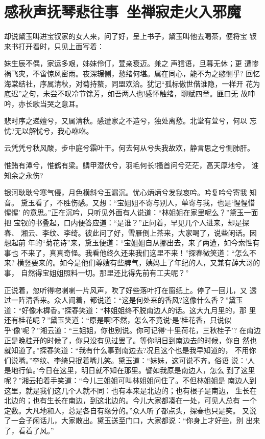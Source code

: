 \chapter{感秋声抚琴悲往事~坐禅寂走火入邪魔}

却说黛玉叫进宝钗家的女人来，问了好，呈上书子，黛玉叫他去喝茶，便将宝
钗来书打开看时，只见上面写着：

妹生辰不偶，家运多艰，姊妹伶仃，萱亲衰迈。兼之声狺语，旦暮无休；更
遭惨祸飞灾，不啻惊风密雨。夜深辗侧，愁绪何堪。属在同心，能不为之愍恻乎?
回忆海棠结社，序属清秋，对菊持螯，同盟欢洽。犹记“孤标傲世偕谁隐，一样开
花为底迟”之句，未尝不叹冷节馀芳，如吾两人也!感怀触绪，聊赋四章。匪曰无
故呻吟，亦长歌当哭之意耳。

悲时序之递嬗兮，又属清秋。感遭家之不造兮，独处离愁。北堂有萱兮，何以
忘忧?无以解忧兮，我心咻咻。

云凭凭兮秋风酸，步中庭兮霜叶干。何去何从兮失我故欢，静言思之兮恻肺肝。

惟鲔有潭兮，惟鹤有梁。鳞甲潜伏兮，羽毛何长!搔首问兮茫茫，高天厚地兮，
谁知余之永伤?

银河耿耿兮寒气侵，月色横斜兮玉漏沉。忧心炳炳兮发我哀吟。吟复吟兮寄我
知音。
黛玉看了，不胜伤感。又想：“宝姐姐不寄与别人，单寄与我，也是‘惺惺惜惺惺’
的意思。”正在沉吟，只听见外面有人说道：“林姐姐在家里呢么？”黛玉一面把
宝钗的书叠起，口内便答应道：“是谁？”正问着，早见几个人进来，却是探春、
湘云、李纹、李绮。彼此问了好，雪雁倒上茶来，大家喝了，说些闲话。因想起前
年的“菊花诗”来，黛玉便道：“宝姐姐自从挪出去，来了两遭，如今索性有事也
不来了，真真奇怪。我看他终久还来我们这里不来！”探春微笑道：“怎么不来?
横竖要来的。如今是他们尊嫂有些脾气，姨妈上了年纪的人，又兼有薛大哥的事，
自然得宝姐姐照料一切。那里还比得先前有工夫呢？”

正说着，忽听得唿喇喇一片风声，吹了好些落叶打在窗纸上。停了一回儿，又
透过一阵清香来。众人闻着，都说道：“这是何处来的香风?这像什么香？”黛玉
道：“好像木樨香。”探春笑道：“林姐姐终不脱南边人的话。这大九月里的，那
里还有桂花呢？”黛玉笑道：“原是啊!不然，怎么不竟说‘是’桂花香，只说似
乎‘像’呢？”湘云道：“三姐姐，你也别说。你可记得‘十里荷花，三秋桂子’?
在南边正是晚桂开的时候了，你只没有见过罢了。等你明日到南边去的时候，你自
然也就知道了。”探春笑道：“我有什么事到南边去?况且这个也是我早知道的，
不用你们说嘴。”李纹、李绮只抿着嘴儿笑。黛玉道：“妹妹，这可说不齐。俗语
说：‘人是地行仙。’今日在这里，明日就不知在那里。譬如我原是南边人，怎么
到了这里呢？”湘云拍着手笑道：“今儿三姐姐可叫林姐姐问住了。不但林姐姐是
南边人到这里，就是我们这几个人就不同：也有本来是北边的；也有根子是南边，
生长在北边的；也有生长在南边，到这北边的。今儿大家都凑在一处，可见人总有
一个定数。大凡地和人，总是各自有缘分的。”众人听了都点头，探春也只是笑。
又说了一会子闲话儿，大家散出。黛玉送至门口，大家都说：“你身上才好些，别
出来了，看着了风。”

